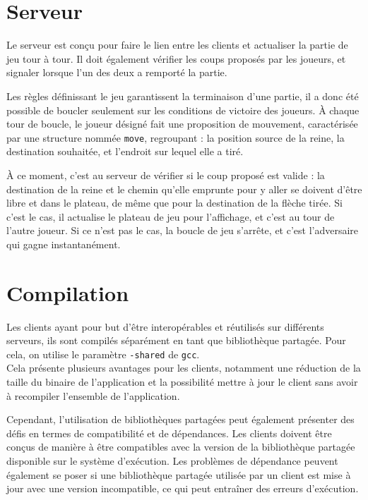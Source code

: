 \section{Serveur}

Le serveur est conçu pour faire le lien entre les clients et actualiser la partie de jeu tour à tour. Il doit également vérifier les coups proposés par les joueurs, et signaler lorsque l'un des deux a remporté la partie.

\medbreak

Les règles définissant le jeu garantissent la terminaison d'une partie, il a donc été possible de boucler seulement sur les conditions de victoire des joueurs. À chaque tour de boucle, le joueur désigné fait une proposition de mouvement, caractérisée par une structure nommée \texttt{move}, regroupant : la position source de la reine, la destination souhaitée, et l'endroit sur lequel elle a tiré.

\medbreak

À ce moment, c'est au serveur de vérifier si le coup proposé est valide : la destination de la reine et le chemin qu'elle emprunte pour y aller se doivent d'être libre et dans le plateau, de même que pour la destination de la flèche tirée. Si c'est le cas, il actualise le plateau de jeu pour l'affichage, et c'est au tour de l'autre joueur. Si ce n'est pas le cas, la boucle de jeu s'arrête, et c'est l'adversaire qui gagne instantanément.  

\section{Compilation}



Les clients ayant pour but d'être interopérables et réutilisés sur différents serveurs, ils sont compilés séparément en tant que bibliothèque partagée. Pour cela, on utilise le paramètre \texttt{-shared} de \texttt{gcc}.\\
Cela présente plusieurs avantages pour les clients, notamment une réduction de la taille du binaire de l'application et la possibilité mettre à jour le client sans avoir à recompiler l'ensemble de l'application.

\medbreak

Cependant, l'utilisation de bibliothèques partagées peut également présenter des défis en termes de compatibilité et de dépendances. Les clients doivent être conçus de manière à être compatibles avec la version de la bibliothèque partagée disponible sur le système d'exécution. Les problèmes de dépendance peuvent également se poser si une bibliothèque partagée utilisée par un client est mise à jour avec une version incompatible, ce qui peut entraîner des erreurs d'exécution.

